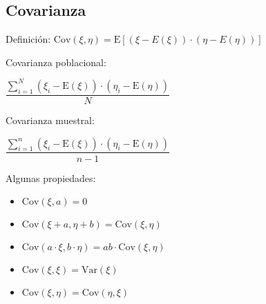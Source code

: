 \documentclass[10pt, a4paper, landscape]{extarticle}
\newcommand{\E}{\mathrm{E}}
\newcommand{\Var}{\mathrm{Var}}
\newcommand{\Cov}{\mathrm{Cov}}
\begin{document}
\begin{multicols}{3}
		\subsection*{Covarianza}
		Definición: \quad $\Cov(\xi, \eta) = \E[(\xi - E(\xi)) \cdot (\eta - E(\eta))]$
		\begin{multicols}{2}
			Covarianza poblacional:
			\begin{center}
				$\dfrac{\sum_{i=1}^{N} (\xi_i - \E(\xi)) \cdot (\eta_i - \E(\eta))}{N}$
			\end{center}
			\columnbreak
			Covarianza muestral:
			\begin{center}
				$\dfrac{\sum_{i=1}^{n} (\xi_i - \E(\xi)) \cdot (\eta_i - \E(\eta))}{n-1}$
			\end{center}
		\end{multicols}
		Algunas propiedades:
		\begin{itemize}[leftmargin=*]
			\item $\Cov(\xi, a) = 0$
			\item $\Cov(\xi + a, \eta + b) = \Cov(\xi, \eta)$
			\item $\Cov(a \cdot \xi, b \cdot \eta) = a b \cdot \Cov(\xi, \eta)$
			\item $\Cov(\xi, \xi) = \Var(\xi)$
			\item $\Cov(\xi, \eta) = \Cov(\eta, \xi)$
		\end{itemize}
\end{multicols}
\pagebreak
\end{document}
